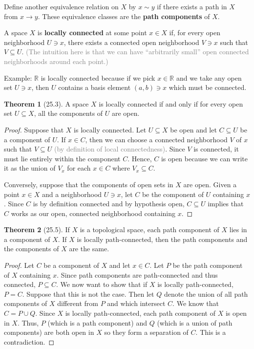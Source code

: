\documentclass{article}
\newcommand{\nline}{\vspace*{0.5\baselineskip}}
\newcommand{\com}[1]{\textcolor{grey}{#1}}
\theoremstyle{definition}
\newtheorem{theorem}{Theorem}[subsection]
\begin{document}
\begin{flushleft}
\nline

Define another equivalence relation on $X$ by $x \sim y$ if there exists a path in $X$ from $x \to y$. These equivalence classes are the \textbf{path components} of $X$.

\nline

A space $X$ is \textbf{locally connected} at some point $x \in X$ if, for every open neighborhood $U \ni x$, there exists a connected open neighborhood $V \ni x$ such that $V \subseteq U$. \com{(The intuition here is that we can have ``arbitrarily small'' open connected neighborhoods around each point.)}

\nline

Example: $\mathbb{R}$ is locally connected because if we pick $x \in \mathbb{R}$ and we take any open set $U \ni x$, then $U$ contains a basis element $(a,b) \ni x$ which must be connected.

\begin{theorem}[25.3]
A space $X$ is locally connected if and only if for every open set $U \subseteq X$, all the components of $U$ are open.
\end{theorem}

\begin{proof}
Suppose that $X$ is locally connected. Let $U \subseteq X$ be open and let $C \subseteq U$ be a component of $U$. If $x \in C$, then we can choose a connected neighborhood $V$ of $x$ such that $V \subseteq U$ \com{(by definition of local connectedness)}. Since $V$ is connected, it must lie entirely within the component $C$. Hence, $C$ is open because we can write it as the union of $V_x$ for each $x \in C$ where $V_x \subseteq C$.

\nline

Conversely, suppose that the components of open sets in $X$ are open. Given a point $x \in X$ and a neighborhood $U \ni x$, let $C$ be the component of $U$ containing $x$. Since $C$ is by definition connected and by hypothesis open, $C \subseteq U$ implies that $C$ works as our open, connected neighborhood containing $x$.
\end{proof}

\begin{theorem}[25.5]
If $X$ is a topological space, each path component of $X$ lies in a component of $X$. If $X$ is locally path-connected, then the path components and the components of $X$ are the same.
\end{theorem}

\begin{proof}
Let $C$ be a component of $X$ and let $x \in C$. Let $P$ be the path component of $X$ containing $x$. Since path components are path-connected and thus connected, $P \subseteq C$. We now want to show that if $X$ is locally path-connected, $P = C$. Suppose that this is not the case. Then let $Q$ denote the union of all path components of $X$ different from $P$ and which intersect $C$. We know that $C = P \cup Q$. Since $X$ is locally path-connected, each path component of $X$ is open in $X$. Thus, $P$ (which is a path component) and $Q$ (which is a union of path components) are both open in $X$ so they form a separation of $C$. This is a contradiction.
\end{proof}


\end{flushleft}
\end{document}
